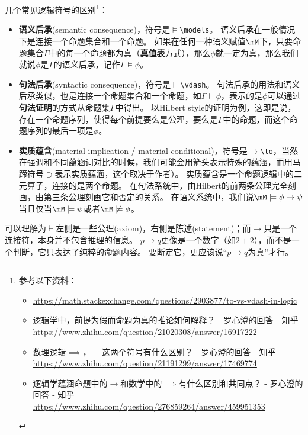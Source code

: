 几个常见逻辑符号的区别\footnote{参考以下资料：
\begin{itemize}
	\item \url{https://math.stackexchange.com/questions/2903877/to-vs-vdash-in-logic}
	\item 逻辑学中，前提为假而命题为真的推论如何解释？ - 罗心澄的回答 - 知乎 \url{https://www.zhihu.com/question/21020308/answer/16917222}
	\item 数理逻辑$\implies$，$|$ - 这两个符号有什么区别？ - 罗心澄的回答 - 知乎 \url{https://www.zhihu.com/question/21191299/answer/17469774}
	\item 逻辑学蕴涵命题中的$\to$和数学中的$\implies$有什么区别和共同点？ - 罗心澄的回答 - 知乎 \url{https://www.zhihu.com/question/276859264/answer/459951353}
\end{itemize}}：
\begin{itemize}
\item \textbf{语义后承}(semantic consequence)，符号是$\models$\verb'\models'。
语义后承在一般情况下是连接一个命题集合和一个命题。
如果在任何一种语义赋值$\mM$下，只要命题集合$\Gamma$中的每一个命题都为真（\textbf{真值表}方式），那么$\phi$就一定为真，那么我们就说$\phi$是$\Gamma$的语义后承，记作$\Gamma\models\phi$。
\item \textbf{句法后承}(syntactic consequence)，符号是$\vdash$\verb'\vdash'。
句法后承的用法和语义后承类似，也是连接一个命题集合和一个命题，如$\Gamma\vdash\phi$，表示的是$\phi$可以通过\textbf{句法证明}的方式从命题集$\Gamma$中得出。
以Hilbert style的证明为例，这即是说，存在一个命题序列，使得每个前提要么是公理，要么是$\Gamma$中的命题，而这个命题序列的最后一项是$\phi$。
\item \textbf{实质蕴含}(material implication / material conditional)，符号是$\to$\verb'\to'，当然在强调和不同蕴涵词对比的时候，我们可能会用箭头表示特殊的蕴涵，而用马蹄符号$\supset$表示实质蕴涵，这个取决于作者）。
实质蕴含是一个命题逻辑中的二元算子，连接的是两个命题。
在句法系统中，由Hilbert的前两条公理完全刻画，由第三条公理刻画它和否定的关系。
在语义系统中，我们说$\mM\models\phi\to\psi$当且仅当$\mM\models\psi$或者$\mM\not\models\phi$。
\end{itemize}
可以理解为$\vdash$左侧是一些公理(axiom)，右侧是陈述(statement)；而$\to$只是一个连接符，本身并不包含推理的信息。
$p\to q$更像是一个数字（如$2+2$），而不是一个判断，它只表达了纯粹的命题内容。
要断定它，更应该说“$p\to q$为真”才行。

